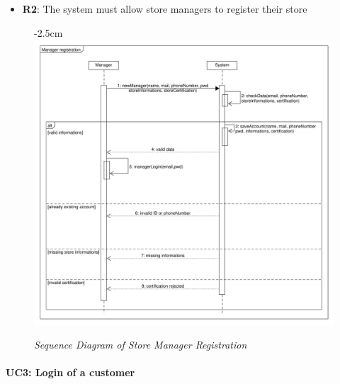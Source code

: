 \documentclass{article}
\begin{document}
\begin{center}
\begin{adjustwidth}{-3cm}{}
\begin{tabular}[h!]{|m{7.5em}|m{36em}|}
					\end{tabular}
					\end{adjustwidth}
					
					\begin{itemize}
					\bigskip
					\bigskip
					\bigskip
					 {\bfseries Required functional requirements: }
					\item {\bfseries R2}: The system must allow store managers to register their store

					\end{itemize}
				
							\begin{figure}
								\begin{adjustwidth} {-2.5cm}{}
									\centering
									\includegraphics[scale=0.5]{SD/2_storeManagerRegistration.pdf}\\
									\caption{\emph{Sequence Diagram of Store Manager Registration}}
								\end{adjustwidth}
							\end{figure}

				\end{center}

			\newpage
			
			\paragraph{UC3: Login of a customer}
			
\end{document}
